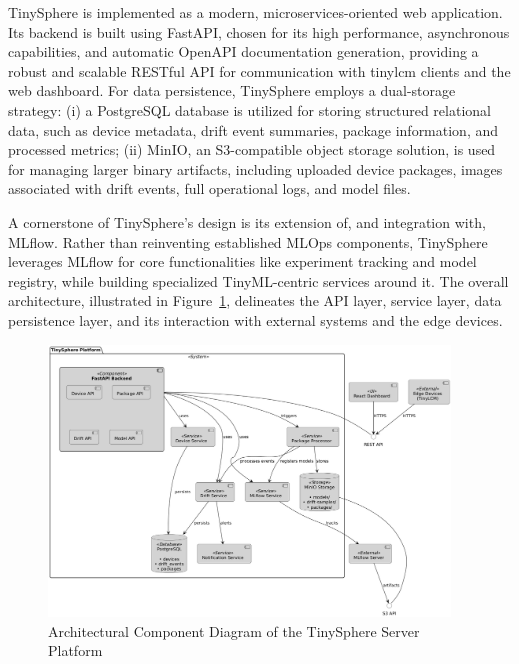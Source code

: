 TinySphere is implemented as a modern, microservices-oriented web application. Its backend is built using FastAPI, chosen for its high performance, asynchronous capabilities, and automatic OpenAPI documentation generation, providing a robust and scalable RESTful API for communication with \gls{tinylcm} clients and the web dashboard. For data persistence, TinySphere employs a dual-storage strategy: (i) a PostgreSQL database is utilized for storing structured relational data, such as device metadata, drift event summaries, package information, and processed metrics; (ii) MinIO, an S3-compatible object storage solution, is used for managing larger binary artifacts, including uploaded device packages, images associated with drift events, full operational logs, and model files.

A cornerstone of TinySphere's design is its extension of, and integration with, MLflow. Rather than reinventing established MLOps components, TinySphere leverages MLflow for core functionalities like experiment tracking and model registry, while building specialized TinyML-centric services around it. The overall architecture, illustrated in Figure~\ref{fig:tinysphere_architecture_diagram}, delineates the API layer, service layer, data persistence layer, and its interaction with external systems and the edge devices.

\begin{figure}[htbp]
    \centering
    \includegraphics[width=0.95\textwidth]{figs/framework/tinysphere-architecture.png}
    \caption[Architectural Design of the TinySphere Server Platform]{Architectural Component Diagram of the TinySphere Server Platform}
    \label{fig:tinysphere_architecture_diagram}
\end{figure}

